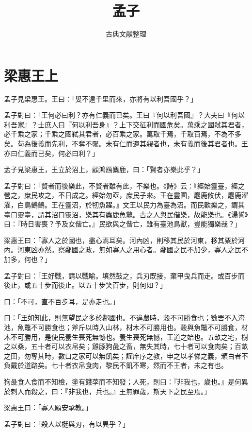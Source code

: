 \documentclass[12pt,a4paper]{ctexbook}
\title{孟子}
\author{古典文献整理}
\date{}
\begin{document}
\maketitle
\tableofcontents
\newpage
\section{梁惠王上}
孟子見梁惠王。王曰：「叟不遠千里而來，亦將有以利吾國乎？」\par
孟子對曰：「王何必曰利？亦有仁義而已矣。王曰『何以利吾國』？大夫曰『何以利吾家』？士庶人曰『何以利吾身』？上下交征利而國危矣。萬乘之國弒其君者，必千乘之家；千乘之國弒其君者，必百乘之家。萬取千焉，千取百焉，不為不多矣。苟為後義而先利，不奪不饜。未有仁而遺其親者也，未有義而後其君者也。王亦曰仁義而已矣，何必曰利？」\par
孟子見梁惠王，王立於沼上，顧鴻鴈麋鹿，曰：「賢者亦樂此乎？」\par
孟子對曰：「賢者而後樂此，不賢者雖有此，不樂也。《詩》云：『經始靈臺，經之營之，庶民攻之，不日成之。經始勿亟，庶民子來。王在靈囿，麀鹿攸伏，麀鹿濯濯，白鳥鶴鶴。王在靈沼，於牣魚躍。』文王以民力為臺為沼。而民歡樂之，謂其臺曰靈臺，謂其沼曰靈沼，樂其有麋鹿魚鼈。古之人與民偕樂，故能樂也。《湯誓》曰：『時日害喪？予及女偕亡。』民欲與之偕亡，雖有臺池鳥獸，豈能獨樂哉？」\par
梁惠王曰：「寡人之於國也，盡心焉耳矣。河內凶，則移其民於河東，移其粟於河內。河東凶亦然。察鄰國之政，無如寡人之用心者。鄰國之民不加少，寡人之民不加多，何也？」\par
孟子對曰：「王好戰，請以戰喻。填然鼓之，兵刃既接，棄甲曳兵而走。或百步而後止，或五十步而後止。以五十步笑百步，則何如？」\par
曰：「不可，直不百步耳，是亦走也。」\par
曰：「王如知此，則無望民之多於鄰國也。不違農時，穀不可勝食也；數罟不入洿池，魚鼈不可勝食也；斧斤以時入山林，材木不可勝用也。穀與魚鼈不可勝食，材木不可勝用，是使民養生喪死無憾也。養生喪死無憾，王道之始也。五畝之宅，樹之以桑，五十者可以衣帛矣；雞豚狗彘之畜，無失其時，七十者可以食肉矣；百畝之田，勿奪其時，數口之家可以無飢矣；謹庠序之教，申之以孝悌之義，頒白者不負戴於道路矣。七十者衣帛食肉，黎民不飢不寒，然而不王者，未之有也。\par
狗彘食人食而不知檢，塗有餓莩而不知發；人死，則曰：『非我也，歲也。』是何異於刺人而殺之，曰：『非我也，兵也。』王無罪歲，斯天下之民至焉。」\par
梁惠王曰：「寡人願安承教。」\par
孟子對曰：「殺人以梃與刃，有以異乎？」\par
\end{document}
